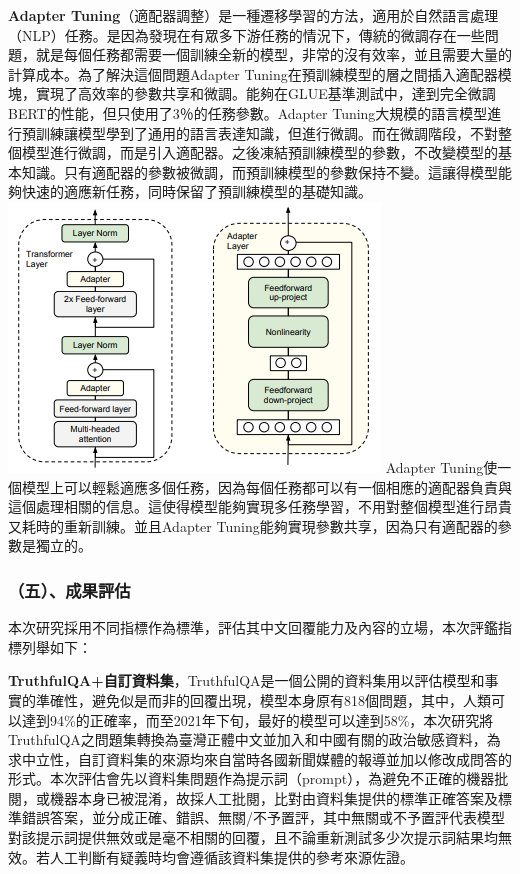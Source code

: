 \documentclass[8pt,a4paper,新細明體,UTF8,natbib]{article}
\begin{document}
\begin{CJK*}{UTF8}{bsmi}
	\textbf{Adapter Tuning}（適配器調整）是一種遷移學習的方法，適用於自然語言處理（NLP）任務。是因為發現在有眾多下游任務的情況下，傳統的微調存在一些問題，就是每個任務都需要一個訓練全新的模型，非常的沒有效率，並且需要大量的計算成本。為了解決這個問題Adapter Tuning在預訓練模型的層之間插入適配器模塊，實現了高效率的參數共享和微調。能夠在GLUE基準測試中，達到完全微調BERT的性能，但只使用了3％的任務參數。Adapter Tuning大規模的語言模型進行預訓練讓模型學到了通用的語言表達知識，但進行微調。而在微調階段，不對整個模型進行微調，而是引入適配器。之後凍結預訓練模型的參數，不改變模型的基本知識。只有適配器的參數被微調，而預訓練模型的參數保持不變。這讓得模型能夠快速的適應新任務，同時保留了預訓練模型的基礎知識。
	\includegraphics[width=\textwidth]{adapterlearning}
	Adapter Tuning使一個模型上可以輕鬆適應多個任務，因為每個任務都可以有一個相應的適配器負責與這個處理相關的信息。這使得模型能夠實現多任務學習，不用對整個模型進行昂貴又耗時的重新訓練。並且Adapter Tuning能夠實現參數共享，因為只有適配器的參數是獨立的。\cite{zhou2022efficiently}


	\subsubsection{（五）、成果評估}
	本次研究採用不同指標作為標準，評估其中文回覆能力及內容的立場，本次評鑑指標列舉如下：
	\newline

	\textbf{TruthfulQA+自訂資料集}，TruthfulQA是一個公開的資料集用以評估模型和事實的準確性，避免似是而非的回覆出現，模型本身原有818個問題，其中，人類可以達到94\%的正確率，而至2021年下旬，最好的模型可以達到58\%\cite{lin2022truthfulqa}，本次研究將TruthfulQA之問題集轉換為臺灣正體中文並加入和中國有關的政治敏感資料，為求中立性，自訂資料集的來源均來自當時各國新聞媒體的報導並加以修改成問答的形式。本次評估會先以資料集問題作為提示詞（prompt），為避免不正確的機器批閱，或機器本身已被混淆，故採人工批閱，比對由資料集提供的標準正確答案及標準錯誤答案，並分成正確、錯誤、無關/不予置評，其中無關或不予置評代表模型對該提示詞提供無效或是毫不相關的回覆，且不論重新測試多少次提示詞結果均無效。若人工判斷有疑義時均會遵循該資料集提供的參考來源佐證。


\end{CJK*}
\end{document}
